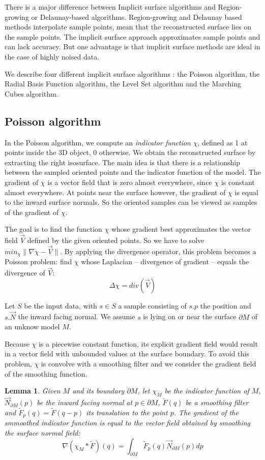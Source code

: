 \documentclass[a4paper]{article}
\begin{document}
There is a major difference between Implicit surface algorithms and Region-growing or Delaunay-based algorithms. Region-growing and Delaunay based methods interpolate sample points, mean that the reconstructed surface lies on the sample points. The implicit surface approach approximates sample points and can lack accuracy. But one advantage is that implicit surface methods are ideal in the case of highly noised data.

We describe four different implicit surface algorithms : the Poisson algorithm, the Radial Basis Function algorithm, the Level Set algorithm and the Marching Cubes algorithm.


\subsection{Poisson algorithm}
In the Poisson algorithm, we compute an \emph{indicator function} $\chi$, defined as 1 at points inside the 3D object, 0 otherwise. We obtain the reconstructed surface by extracting the right isosurface. The main idea is that there is a relationship between the sampled oriented points and the indicator function of the model. The gradient of $\chi$ is  a vector field that is zero almost everywhere, since $\chi$ is constant almost everywhere. At points near the surface however, the gradient of $\chi$ is equal to the inward surface normals. So the oriented samples can be viewed as samples of the gradient of $\chi$.

The goal is to find the function $\chi$ whose gradient best approximates the vector field $\vec{V}$ defined by the given oriented points. So we have to solve $min_\chi\|\nabla\chi - \vec{V}\|$. By applying the divergence operator, this problem becomes a Poisson problem: find $\chi$ whose Laplacian -- divergence of gradient -- equals the divergence of $\vec{V}$:
$$\Delta\chi = div(\vec{V})$$

Let $S$ be the input data, with $s \in S$ a sample consisting of $s.p$ the position and $s.\vec{N}$ the inward facing normal. We assume $s$ is lying on or near the surface $\partial M$ of an unknow model $M$.

Because $\chi$ is a piecewise constant function, its explicit gradient field would result in a vector field with unbounded values at the surface boundary. To avoid this problem, $\chi$ is convolve with a smoothing filter and we consider the gradient field of the smoothing function.

\newtheorem{lemma}{Lemma}
\begin{lemma}
Given $M$ and its boundary $\partial M$, let $\chi_M$ be the indicator function of $M$, $\vec{N}_{\partial M}(p)$ be the inward facing normal at $p \in \partial M$, $\tilde{F}(q)$ be a smoothing filter and $\tilde{F}_p(q) = \tilde{F}(q-p)$ its translation to the point $p$. The gradient of the smmoothed indicator function is equal to the vector field obtained by smoothing the surface normal field:
$$\nabla(\chi_M * \tilde{F})(q) = \int_{\partial M} \tilde{F}_p(q) \vec{N}_{\partial M}(p) dp$$
\end{lemma}
\end{document}
